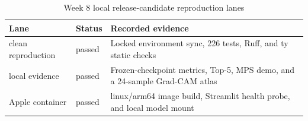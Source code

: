 \begin{table}[htbp]
\centering
\small
\caption{Week 8 local release-candidate reproduction lanes}
\label{tab:week8-repro-en}
\begin{tabular}{lp{}p{}}
\toprule
Lane & Status & Recorded evidence \\
\midrule
clean reproduction & passed & Locked environment sync, 226 tests, Ruff, and ty static checks \\
local evidence & passed & Frozen-checkpoint metrics, Top-5, MPS demo, and a 24-sample Grad-CAM atlas \\
Apple container & passed & linux/arm64 image build, Streamlit health probe, and local model mount \\
\bottomrule
\end{tabular}
\end{table}
